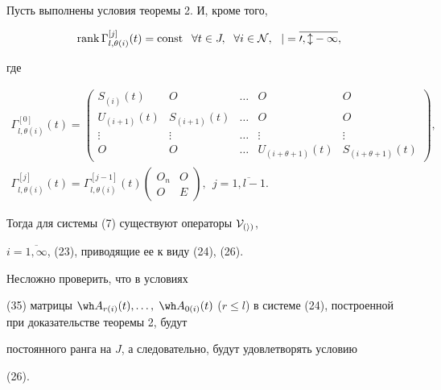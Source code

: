 \begin{cor}


Пусть выполнены условия теоремы 2. И, кроме того,


\begin{equation}


\rank \Gamma_{l,\theta (i)}^{[j]}(t)=\const \ \;


\forall t \in J, \ \; \forall i \in \cal N, \ \ j=\overline{0,l-1},


\end{equation}


где


\begin{gather*}


\Gamma_{l,\theta(i)}^{[0]}(t)=


\begin{pmatrix}


S_{(i)}(t) & O & \dots & O & O \\


U_{(i+1)}(t) & S_{(i+1)}(t) & \dots & O & O \\


\vdots & \vdots & \dotsc & \vdots & \vdots\\


O & O & \dotsc & U_{(i+\theta +1)}(t) &


S_{(i+\theta +1)}(t)


\end{pmatrix}, \\


%


\Gamma_{l,\theta (i)}^{[j]}(t)=\Gamma_{l,\theta (i)}^{[j-1]}(t)


\begin{pmatrix}


O_n & O\\ O & E


\end{pmatrix}, \ \ j=\overline{1, l-1}.


\end{gather*}





Тогда для системы (7) существуют операторы $\cal V_{(i)}$,


$i=\overline{1,\infty}$, (23), приводящие ее к виду (24), (26).


\end{cor}





\begin{pf}


Несложно проверить, что в условиях


(35) матрицы $\wh A_{r(i)}(t), \dotsc,$ $ \wh A_{0(i)}(t)$ ($r \le 


l$) в системе (24), построенной при доказательстве теоремы 2, будут 


постоянного ранга на $J$, а следовательно, будут удовлетворять условию


(26).


\end{pf}





